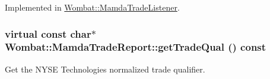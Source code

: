 Implemented in \hyperlink{classWombat_1_1MamdaTradeListener_a9e5a20840963992b58ec19cf717cfab}{Wombat::Mamda\-Trade\-Listener}.\hypertarget{classWombat_1_1MamdaTradeReport_01f6e34bc27e4c6a9d2262327c2961d7}{
\subsubsection[getTradeQual]{\setlength{\rightskip}{0pt plus 5cm}virtual const char$\ast$ Wombat::Mamda\-Trade\-Report::get\-Trade\-Qual () const}}
\label{classWombat_1_1MamdaTradeReport_01f6e34bc27e4c6a9d2262327c2961d7}


Get the NYSE Technologies normalized trade qualifier. 

